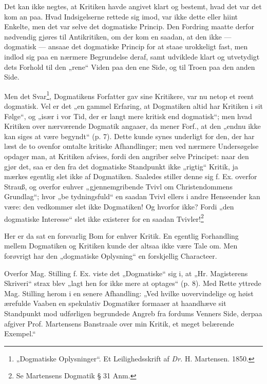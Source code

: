 \documentclass[12pt,a4paper]{book}
\newcommand{\opage}[1]{\marginnote{\footnotesize\textit{[#1]}}}
\begin{document}
Det kan ikke negtes, at Kritiken havde angivet klart og
bestemt, hvad det var det kom an paa. Hvad Indsigelserne
rettede sig imod, var ikke dette eller hiint Enkelte, men det
var selve det dogmatiske Princip. Den Fordring maatte derfor
nødvendig gjøres til Antikritiken, om der kom en saadan, at
den ikke --- dogmatisk --- ansaae det dogmatiske Princip for
at staae urokkeligt fast, men indlod sig paa en nærmere
Begrundelse deraf, samt udviklede klart og utvetydigt dets
Forhold til den „rene“ Viden paa den ene Side, og til Troen
paa den anden Side.

Men det Svar\footnote{„Dogmatiske Oplysninger“. Et Leilighedsskrift af \textit{Dr.} H. Martensen. 1850.}, Dogmatikens Forfatter gav sine
Kritikere, var nu netop et reent dogmatisk. Vel er det „en
gammel Erfaring, at Dogmatiken altid har Kritiken i sit
Følge“, og „især i vor Tid, der er langt mere kritisk end
dogmatisk“; men hvad Kritiken over nærværende Dogmatik
angaaer, da mener Forf., at den „endnu ikke kan siges at
være begyndt“ (p. 7). Dette kunde synes underligt for den,
der har læst de to ovenfor omtalte kritiske Afhandlinger; men
ved nærmere Undersøgelse opdager man, at Kritiken afvises,
fordi den angriber selve Principet: naar den gjør det, saa er
den fra det dogmatiske Standpunkt ikke „rigtig“ Kritik, ja
mærkes egentlig slet ikke af Dogmatiken. Saaledes stiller
denne sig f. Ex. overfor Strauß, og overfor
euhver „gjennemgribende Tvivl om Christendommens Grundlag“; hvor „be%
\opage{31}\setcounter{footnote}{0}%
tydningsfuld“ en saadan Tvivl ellers i andre Henseender kan
være: den vedkommer slet ikke Dogmatiken! Og hvorfor ikke?
Fordi „den dogmatiske Interesse“ slet ikke existerer for en
saadan Tvivler!\footnote{Se Martensens Dogmatik § 31 Anm.}

Her er da sat en forsvarlig Bom for enhver Kritik.
En egentlig Forhandling mellem Dogmatiken og Kritiken
kunde der altsaa ikke være Tale om. Men forøvrigt har den
„dogmatiske Oplysning“ en forskjellig Characteer.

Overfor Mag. Stilling f. Ex. viste det „Dogmatiske“ sig
i, at „Hr. Magisterens Skriveri“ strax blev „lagt hen for ikke
mere at optages“ (p. 8). Med Rette yttrede Mag. Stilling
herom i en senere Afhandling: „Ved hvilke uovervindelige og
høist ærefulde Vaaben en spekulativ Dogmatiker formaaer at
haandhæve sit Standpunkt mod udførligen begrundede Angreb
fra fordums Venners Side, derpaa afgiver Prof. Martensens
Banstraale over min Kritik, et meget belærende Exempel.“
\end{document}
